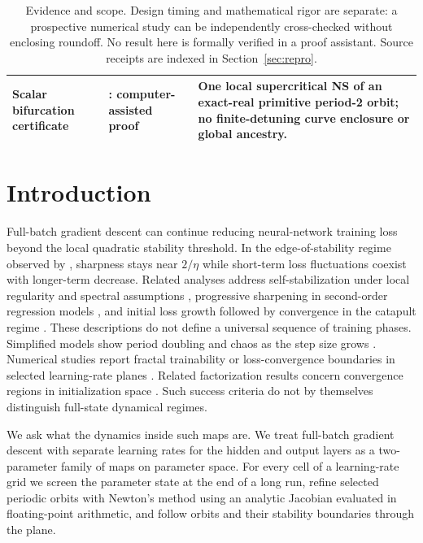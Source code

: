 \documentclass[11pt,letterpaper]{article}
\begin{document}
\begin{table}[htbp]
\begin{tabular}{@{}>{\raggedright\arraybackslash}p{3.0cm}>{\raggedright\arraybackslash}p{3.1cm}>{\raggedright\arraybackslash}p{7.8cm}@{}}
Scalar bifurcation certificate & 3: computer-assisted proof & One local supercritical NS of an exact-real primitive period-2 orbit; no finite-detuning curve enclosure or global ancestry. \\
\bottomrule
\end{tabular}
\caption{Evidence and scope. Design timing and mathematical rigor are separate: a prospective numerical study
can be independently cross-checked without enclosing roundoff. No result here is formally verified in a proof
assistant. Source receipts are indexed in Section~\ref{sec:repro}.}
\label{tab:evidence}
\end{table}

\section{Introduction}
\label{sec:intro}

Full-batch gradient descent can continue reducing neural-network training loss beyond the local quadratic
stability threshold. In the edge-of-stability regime observed by \citet{cohen2021}, sharpness stays near
$2/\eta$ while short-term loss fluctuations coexist with longer-term decrease. Related analyses address
self-stabilization under local regularity and spectral assumptions \citep{damian2023}, progressive sharpening
in second-order regression models \citep{agarwala2023}, and initial loss growth followed by convergence in the
catapult regime \citep{lewkowycz2020}. These descriptions do not define a universal sequence of training phases. Simplified models show period doubling and chaos as the step size grows
\citep{kalra2025,chen2024phases,hofmann2026}. Numerical studies report fractal trainability or loss-convergence
boundaries in selected learning-rate planes \citep{sohldickstein2024,torkamandi2025,liu2024}.
Related factorization results concern convergence regions in initialization space \citep{liang2026}.
Such success criteria do not by themselves distinguish full-state dynamical regimes.

We ask what the dynamics inside such maps are. We treat full-batch gradient descent with separate learning rates
for the hidden and output layers as a two-parameter family of maps on parameter space. For every cell of a
learning-rate grid we screen the parameter state at the end of a long run, refine selected periodic orbits with
Newton's method using an analytic Jacobian evaluated in floating-point arithmetic, and follow orbits and their stability boundaries through the plane.
\end{document}
